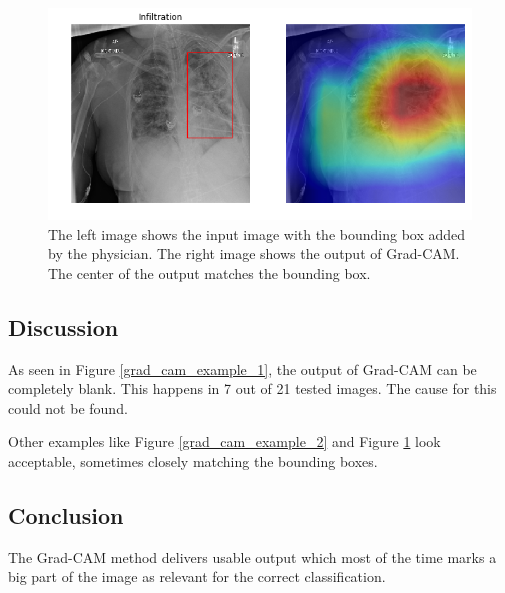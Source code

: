 \begin{figure}[H]
\centering
\includegraphics[width=12cm]{chapters/03_classification/images/grad-cam_8.png}
\caption{The left image shows the input image with the bounding box added by the physician. The right image shows the output of Grad-CAM. The center of the output matches the bounding box.}
\label{grad_cam_example_3}
\end{figure}

\subsection{Discussion}
As seen in Figure \ref{grad_cam_example_1}, the output of Grad-CAM can be completely blank. This happens in 7 out of 21 tested images. The cause for this could not be found.

Other examples like Figure \ref{grad_cam_example_2} and Figure \ref{grad_cam_example_3} look acceptable, sometimes closely matching the bounding boxes.

\subsection{Conclusion}
The Grad-CAM method delivers usable output which most of the time marks a big part of the image as relevant for the correct classification.

